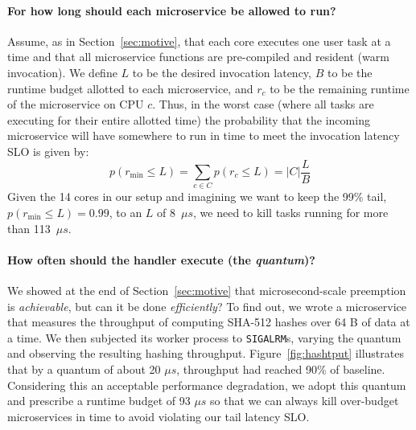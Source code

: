\paragraph{For how long should each microservice be allowed to run?}
Assume, as in Section~\ref{sec:motive}, that each core executes one user task at a
time and that all microservice
functions are pre-compiled and resident (warm invocation).
We define $L$ to be the desired invocation latency, $B$ to be the
runtime budget allotted to each microservice, and $r_c$ to be the remaining runtime
of the microservice on CPU $c$.  Thus, in the worst case (where all tasks are
executing for their entire allotted time) the probability that the incoming
microservice will have somewhere to run in time to meet the invocation
latency SLO is given by:
\begin{equation}
p(r_\textrm{min} \le L) = \sum\limits_{c \in C} p(r_c \le L) = \big| C \big| \frac{L}{B}
\end{equation}
Given the 14 cores in our setup and imagining we want to keep the 99\% tail,
$p(r_\textrm{min} \le L) = 0.99$, to an $L$ of 8~$\mu{}s$, we need to kill tasks
running for more than 113~$\mu{}s$.

\paragraph{How often should the handler execute (the \emph{quantum})?}
We showed at the end of Section~\ref{sec:motive} that microsecond-scale preemption is
\textit{achievable}, but can it be done \textit{efficiently}?  To find out, we wrote
a microservice that measures the throughput of computing SHA-512 hashes over 64 B of
data at a time.  We then subjected its worker process to \texttt{SIGALRM}s, varying
the quantum and observing the resulting hashing throughput.
Figure~\ref{fig:hashtput} illustrates that by a quantum of about 20 $\mu{}s$,
throughput had reached 90\% of baseline.  Considering this an acceptable performance
degradation, we adopt this quantum and prescribe a runtime budget of 93 $\mu{}s$ so
that we can always kill over-budget microservices in time to avoid violating our tail
latency SLO.

